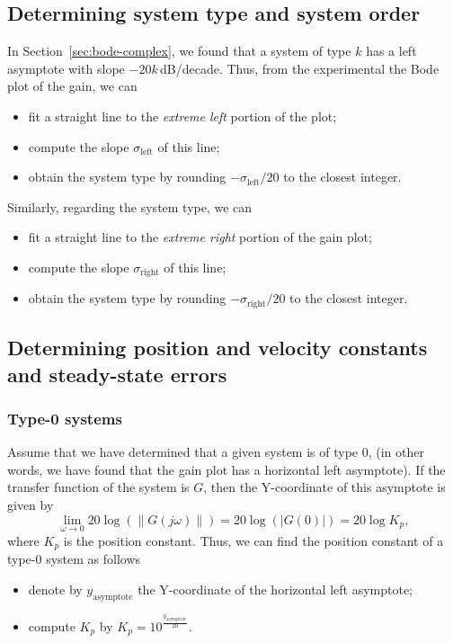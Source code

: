 \documentclass[a4paper,11pt]{report}
\theoremstyle{definition}
\begin{document}
\subsection{Determining system type and system order}

In Section~\ref{sec:bode-complex}, we found that a system of type $k$
has a left asymptote with slope $-20k$\,dB/decade. Thus, from the
experimental the Bode plot of the gain, we can
\begin{itemize}
\item fit a straight line to the \emph{extreme left} portion of the
  plot;
\item compute the slope $\sigma_\mathrm{left}$ of this line;
\item obtain the system type by rounding $-\sigma_\mathrm{left}/20$
  to the closest integer.
\end{itemize}

Similarly, regarding the system type, we can
\begin{itemize}
\item fit a straight line to the \emph{extreme right} portion of the
  gain plot;
\item compute the slope $\sigma_\mathrm{right}$ of this line;
\item obtain the system type by rounding $-\sigma_\mathrm{right}/20$
  to the closest integer.
\end{itemize}

\subsection{Determining position and velocity constants and steady-state
  errors}
\label{sec:errors}

\subsubsection{Type-0 systems}

Assume that we have determined that a given system is of type 0, (in
other words, we have found that the gain plot has a horizontal left
asymptote). If the transfer function of the system is $G$, then the
Y-coordinate of this asymptote is given by
\[
\lim_{\omega\to 0} 20\log(\|G(j\omega)\|) = 20\log(|G(0)|) = 20\log K_p,
\]
where $K_p$ is the position constant. Thus, we can find the position
constant of a type-0 system as follows
\begin{itemize}
\item denote by $y_\mathrm{asymptote}$ the Y-coordinate of the horizontal
  left asymptote;
\item compute $K_p$ by $K_p = 10^{\frac{y_\mathrm{asymptote}}{20}}$.
\end{itemize}
\end{document}
